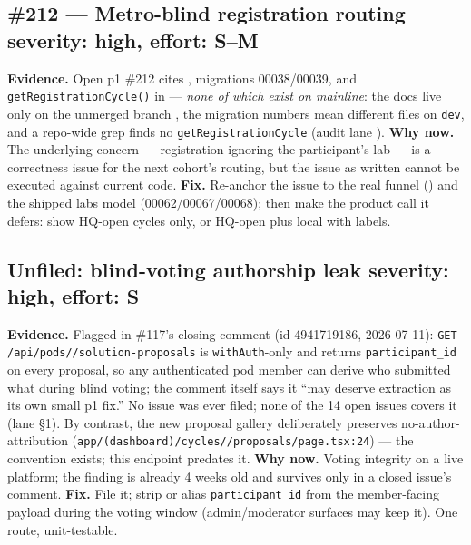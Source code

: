 \documentclass[10pt]{article}
\newcommand{\gh}[1]{\mbox{\##1}}
\newcommand{\sev}[1]{\textbf{#1}}
\begin{document}
\subsection{\gh{212} --- Metro-blind registration routing \hfill \sev{severity: high, effort: S--M}}
\textbf{Evidence.} Open p1 \gh{212} cites , migrations 00038/00039, and \texttt{getRegistrationCycle()} in  --- \emph{none of which exist on mainline}: the docs live only on the unmerged branch , the migration numbers mean different files on \texttt{dev}, and a repo-wide grep finds no \texttt{getRegistrationCycle} (audit lane ).
\textbf{Why now.} The underlying concern --- registration ignoring the participant's lab --- is a correctness issue for the next cohort's routing, but the issue as written cannot be executed against current code.
\textbf{Fix.} Re-anchor the issue to the real funnel () and the shipped labs model (00062/00067/00068); then make the product call it defers: show HQ-open cycles only, or HQ-open plus local with labels.

\subsection{Unfiled: blind-voting authorship leak \hfill \sev{severity: high, effort: S}}
\textbf{Evidence.} Flagged in \gh{117}'s closing comment (id 4941719186, 2026-07-11): \texttt{GET /api/pods/\allowbreak[pod\_id]/\allowbreak solution-proposals} is \texttt{withAuth}-only and returns \texttt{participant\_id} on every proposal, so any authenticated pod member can derive who submitted what during blind voting; the comment itself says it ``may deserve extraction as its own small p1 fix.'' No issue was ever filed; none of the 14 open issues covers it (lane  \S1). By contrast, the new proposal gallery deliberately preserves no-author-attribution (\texttt{app/(dashboard)/cycles/\allowbreak[cycle\_id]/\allowbreak proposals/\allowbreak page.tsx:24}) --- the convention exists; this endpoint predates it.
\textbf{Why now.} Voting integrity on a live platform; the finding is already 4 weeks old and survives only in a closed issue's comment.
\textbf{Fix.} File it; strip or alias \texttt{participant\_id} from the member-facing payload during the voting window (admin/moderator surfaces may keep it). One route, unit-testable.
\end{document}
